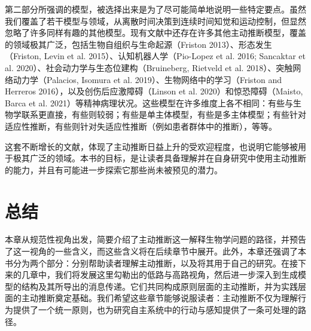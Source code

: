 第二部分所强调的模型，被选择出来是为了尽可能简单地说明一些特定要点。虽然我们覆盖了若干模型与领域，从离散时间决策到连续时间知觉和运动控制，但显然忽略了许多同样有趣的其他模型。现有文献中还存在许多其他主动推断模型，覆盖的领域极其广泛，包括生物自组织与生命起源（Friston 2013）、形态发生（Friston, Levin et al. 2015）、认知机器人学（Pio-Lopez et al. 2016; Sancaktar et al. 2020）、社会动力学与生态位建构（Bruineberg, Rietveld et al. 2018）、突触网络动力学（Palacios, Isomura et al. 2019）、生物网络中的学习（Friston and Herreros 2016），以及创伤后应激障碍（Linson et al. 2020）和惊恐障碍（Maisto, Barca et al. 2021）等精神病理状况。这些模型在许多维度上各不相同：有些与生物学联系更直接，有些则较弱；有些是单主体模型，有些是多主体模型；有些针对适应性推断，有些则针对失适应性推断（例如患者群体中的推断），等等。

这套不断增长的文献，体现了主动推断日益上升的受欢迎程度，也说明它能够被用于极其广泛的领域。本书的目标，是让读者具备理解并在自身研究中使用主动推断的能力，并且有可能进一步探索它那些尚未被预见的潜力。

\section{总结}

本章从规范性视角出发，简要介绍了主动推断这一解释生物学问题的路径，并预告了这一视角的一些含义，而这些含义将在后续章节中展开。此外，本章还强调了本书分为两个部分：分别帮助读者理解主动推断，以及将其用于自己的研究。在接下来的几章中，我们将发展这里勾勒出的低路与高路视角，然后进一步深入到生成模型的结构及其所导出的消息传递。它们共同构成原则层面的主动推断，并为实践层面的主动推断奠定基础。我们希望这些章节能够说服读者：主动推断不仅为理解行为提供了一个统一原则，也为研究自主系统中的行动与感知提供了一条可处理的路径。
